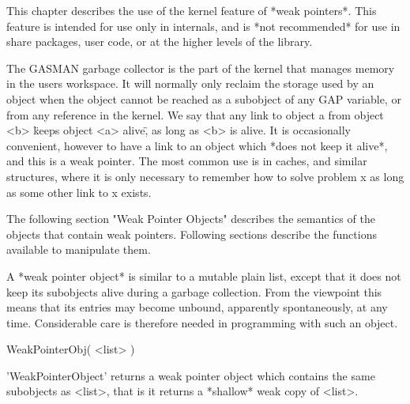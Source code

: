 

This chapter describes the use of the kernel feature of *weak pointers*. This
feature is  intended    for use only   in  {\GAP}  internals,  and  is   *not
recommended* for use in share packages, user code, or at the higher levels of
the library.

The GASMAN garbage collector is the part of the kernel that manages memory in
the users workspace.  It will  normally only reclaim  the storage used by  an
object when the object cannot be reached as a subobject  of any GAP variable,
or from any reference in  the kernel. We say that  any link to object a  from
object  <b>  \"keeps object <a>  alive\",  as long  as <b>  is  alive.  It is
occasionally convenient, however to have a link to an  object which *does not
keep   it alive*, and this  is  a weak pointer.   The  most common  use is in
caches, and similar structures, where it is only necessary to remember how to
solve problem x as long as some other link to x exists.

The  following section "Weak Pointer  Objects" describes the semantics of the
objects that contain weak pointers. Following sections describe the functions
available to manipulate them.


A  *weak pointer object* is  similar to a  mutable plain list, except that it
does  not  keep its subobjects alive   during a garbage collection.  From the
{\GAP} viewpoint this  means that its  entries may become unbound, apparently
spontaneously,  at  any   time.  Considerable care   is  therefore needed  in
programming with such an object.


\>WeakPointerObj( <list> )

'WeakPointerObject' returns  a  weak pointer object  which contains  the same
subobjects as <list>, that is it returns a *shallow* weak copy of <list>.

